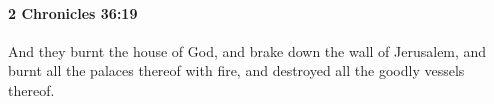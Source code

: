 
		\paragraph{2 Chronicles 36:19} %
			\label{2CHRONICLES-36-19}

			And they burnt the house of God, and brake down the wall of Jerusalem, and burnt all the palaces thereof with fire, and destroyed all the goodly vessels thereof.


